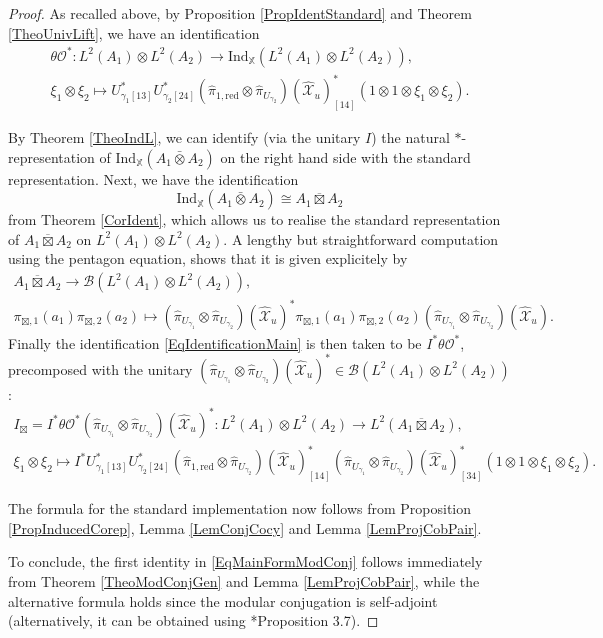 \documentclass[reqno]{amsart}
\numberwithin{equation}{section}
\newcommand{\mcB}{\mathcal{B}}
\newcommand{\X}{\mathbb{X}}
\newcommand{\Ind}{\mathrm{Ind}}
\newcommand{\mcX}{\mathcal{X}}
\newcommand{\red}{\mathrm{red}}
\newcommand{\ov}{\overline}
\newcommand{\mc}{\mathcal}
\newcommand{\wh}{\widehat}
\begin{document}
\begin{proof}
As recalled above, by Proposition \ref{PropIdentStandard} and Theorem \ref{TheoUnivLift}, we have an identification 
\begin{multline}\label{eq51}
\theta\mc{O}^* \colon L^2(A_1)\otimes L^2(A_2) \rightarrow \Ind_{\X}(L^2(A_1)\otimes L^2(A_2)),\\
 \xi_1\otimes \xi_2 \mapsto U_{\gamma_1[13]}^*U_{\gamma_2[24]}^*(\hat{\pi}_{1,\red}\otimes \hat{\pi}_{U_{\gamma_2}})(\wh{\mc{X}}_u)_{[14]}^*(1\otimes 1 \otimes \xi_1\otimes \xi_2). 
\end{multline}

By Theorem \ref{TheoIndL}, we can identify (via the unitary $I$) the natural $*$-representation of $\Ind_{\X}(A_1\bar{\otimes} A_2)$ on the right hand side with the standard representation. Next, we  have the identification 
\[
\Ind_{\X}(A_1\bar{\otimes} A_2) \cong A_1\ov{\boxtimes} A_2
\] 
from Theorem \ref{CorIdent}, which allows us to realise the standard representation of $A_1\ov\boxtimes A_2$ on $L^2(A_1)\otimes L^2(A_2)$. A lengthy but straightforward computation using the pentagon equation, shows that it is given explicitely by
\begin{multline*}
A_1\overline{\boxtimes} A_2 \rightarrow \mcB(L^2(A_1)\otimes L^2(A_2)),\\
\pi_{\boxtimes,1}(a_1)\pi_{\boxtimes,2}(a_2) \mapsto (\hat{\pi}_{U_{\gamma_1}}\otimes \hat{\pi}_{U_{\gamma_2}})(\wh{\mcX}_u) ^*\pi_{\boxtimes,1}(a_1)\pi_{\boxtimes,2}(a_2) (\hat{\pi}_{U_{\gamma_1}}\otimes \hat{\pi}_{U_{\gamma_2}})(\wh{\mcX}_u).
\end{multline*}
Finally the identification \eqref{EqIdentificationMain} is then taken to be $I^*\theta\mc{O}^*$, precomposed with the unitary $(\hat{\pi}_{U_{\gamma_1}}\otimes \hat{\pi}_{U_{\gamma_2}})(\wh{\mc{X}}_u)^*\in \mc{B}(L^2(A_1)\otimes L^2(A_2))$:
\begin{multline}\label{eq52}
I_\boxtimes=I^*\theta\mc{O}^*
(\hat{\pi}_{U_{\gamma_1}}\otimes \hat{\pi}_{U_{\gamma_2}})(\wh{\mc{X}}_u)^*\colon 
L^2(A_1)\otimes L^2(A_2) \rightarrow 
L^2(A_1\ov\boxtimes A_2),\\
 \xi_1\otimes \xi_2 \mapsto 
I^* U_{\gamma_1[13]}^*U_{\gamma_2[24]}^*(\hat{\pi}_{1,\red}\otimes \hat{\pi}_{U_{\gamma_2}})(\wh{\mc{X}}_u)_{[14]}^*
(\hat{\pi}_{U_{\gamma_1}}\otimes \hat{\pi}_{U_{\gamma_2}})(\wh{\mc{X}}_u)^*_{[34]} 
 (1\otimes 1 \otimes 
 \xi_1\otimes \xi_2).
\end{multline}

The formula for the standard implementation now follows from Proposition \ref{PropInducedCorep},  Lemma \ref{LemConjCocy} and Lemma \ref{LemProjCobPair}.

To conclude, the first identity in \eqref{EqMainFormModConj} follows immediately from Theorem \ref{TheoModConjGen} and Lemma \ref{LemProjCobPair}, while the alternative formula holds since the modular conjugation is self-adjoint (alternatively, it can be obtained using \cite{Vae01}*{Proposition 3.7}).
\end{proof}
\end{document}
